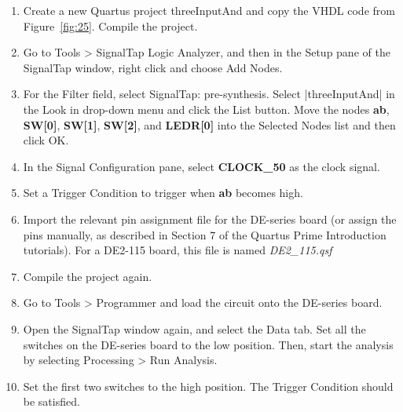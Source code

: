 \documentclass[11pt, twoside, pdftex]{article}
\newcommand{\commonPath}{../../../Common}
\begin{document}
\begin{enumerate}
\item Create a new Quartus project threeInputAnd and copy the VHDL code from Figure~\ref{fig:25}. Compile the project.
\item Go to {\sf Tools > SignalTap Logic Analyzer}, and then in the Setup pane of the SignalTap window, right click
and choose {\sf Add Nodes}.
\item For the {\sf Filter} field, select {\sf SignalTap: pre-synthesis}. Select {\sf |threeInputAnd|} in the {\sf Look in} drop-down menu and click the {\sf List} button. Move the nodes {\bf ab}, {\bf SW[0]}, {\bf SW[1]}, {\bf SW[2]}, and {\bf LEDR[0]} into the Selected Nodes list and then click {\sf OK}.
\item In the Signal Configuration pane, select {\bf CLOCK\_50} as the clock signal.
\item Set a Trigger Condition to trigger when {\bf ab} becomes high.
\item Import the relevant pin assignment file for the DE-series board (or assign the pins manually, as described in Section 7 of the Quartus Prime Introduction tutorials). For a DE2-115 board, this file is named {\it DE2\_115.qsf}
\item Compile the project again.
\item Go to {\sf Tools > Programmer} and load the circuit onto the DE-series board.
\item Open the SignalTap window again, and select the Data tab. Set all the switches on the DE-series board to the low position. Then, start the analysis by selecting {\sf Processing > Run Analysis}.
\item Set the first two switches to the high position. The Trigger Condition should be satisfied.
\end{enumerate}




\end{document}
